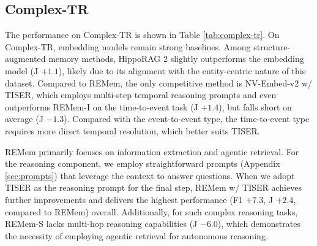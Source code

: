 \documentclass{article} %
\newcommand{\ours}{REMem\xspace}
\begin{document}
\subsection{Complex-TR}
\label{subsec:results-on-complex-tr}


The performance on Complex-TR is shown in Table \ref{tab:complex-tr}.
On Complex-TR, embedding models remain strong baselines. 
Among structure-augmented memory methods, HippoRAG 2 slightly outperforms the embedding model (J $+1.1$), likely due to its alignment with the entity-centric nature of this dataset. 
Compared to \ours, the only competitive method is NV-Embed-v2 w/ TISER, which employs multi-step temporal reasoning prompts and even outperforms \ours-I on the time-to-event task (J $+1.4$), but falls short on average (J $-1.3$).
Compared with the event-to-event type, the time-to-event type requires more direct temporal resolution, which better suits TISER.

\ours primarily focuses on information extraction and agentic retrieval. 
For the reasoning component, we employ straightforward prompts (Appendix \ref{sec:prompts}) that leverage the context to answer questions. 
When we adopt TISER as the reasoning prompt for the final step, \ours w/ TISER achieves further improvements and delivers the highest performance (F1 $+7.3$, J $+2.4$, compared to \ours) overall.
Additionally, for such complex reasoning tasks, \ours-S lacks multi-hop reasoning capabilities (J $-6.0$), which demonstrates the necessity of employing agentic retrieval for autonomous reasoning.
\end{document}

